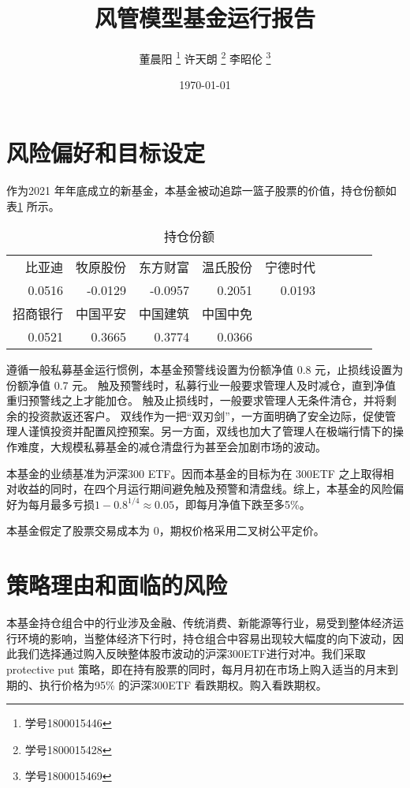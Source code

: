 \documentclass[a4paper,12pt]{ctexart}
\author{董晨阳 \thanks{学号1800015446} 许天朗 \thanks{学号1800015428} 李昭伦 \thanks{学号1800015469}}
\date{\today}
\title{风管模型基金运行报告}
\begin{document}
\maketitle
\tableofcontents
\section{风险偏好和目标设定}
作为2021 年年底成立的新基金，本基金被动追踪一篮子股票的价值，持仓份额如表\ref{holdings} 所示。
\begin{table}[ht]
	\begin{tabular}{rrrrrrrrr}
		比亚迪    & 牧原股份    & 东方财富    & 温氏股份   & 宁德时代   \\
		0.0516 & -0.0129 & -0.0957 & 0.2051 & 0.0193 \\
		招商银行   & 中国平安    & 中国建筑    & 中国中免            \\
		0.0521 & 0.3665  & 0.3774  & 0.0366          \\
	\end{tabular}
	\caption{持仓份额}
	\label{holdings}
\end{table}

遵循一般私募基金运行惯例，本基金预警线设置为份额净值 0.8 元，止损线设置为份额净值 0.7 元。
触及预警线时，私募行业一般要求管理人及时减仓，直到净值重归预警线之上才能加仓。
触及止损线时，一般要求管理人无条件清仓，并将剩余的投资款返还客户。
双线作为一把“双刃剑”，一方面明确了安全边际，促使管理人谨慎投资并配置风控预案。另一方面，双线也加大了管理人在极端行情下的操作难度，大规模私募基金的减仓清盘行为甚至会加剧市场的波动。

本基金的业绩基准为沪深300 ETF。因而本基金的目标为在 300ETF 之上取得相对收益的同时，在四个月运行期间避免触及预警和清盘线。综上，本基金的风险偏好为每月最多亏损\(1-0.8^{1/4}\approx 0.05\)，即每月净值下跌至多5\%。

本基金假定了股票交易成本为 0，期权价格采用二叉树公平定价。
\section{策略理由和面临的风险}
本基金持仓组合中的行业涉及金融、传统消费、新能源等行业，易受到整体经济运行环境的影响，当整体经济下行时，持仓组合中容易出现较大幅度的向下波动，因此我们选择通过购入反映整体股市波动的沪深300ETF进行对冲。我们采取 protective put 策略，即在持有股票的同时，每月月初在市场上购入适当的月末到期的、执行价格为95\% 的沪深300ETF 看跌期权。购入看跌期权。
\end{document}
